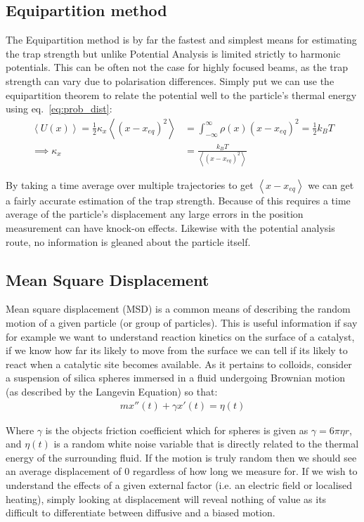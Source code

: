 \subsection{Equipartition method}
The Equipartition method is by far the fastest and simplest means 
for estimating the trap strength but unlike Potential Analysis is 
limited strictly to harmonic potentials. This can be often not the 
case for highly focused beams, as the trap strength can vary due to 
polarisation differences. Simply put we can use the equipartition 
theorem to relate the potential well to the particle's thermal 
energy using eq.~\ref{eq:prob_dist}:
\begin{align}
	\left<U(x)\right> = \frac{1}{2}\kappa_x\left<(x-x_{eq})^2\right> &= \int_{-\infty}^{\infty}\rho(x)(x-x_{eq})^2 = \frac{1}{2}k_BT \\
	\implies \kappa_x &= \frac{k_BT}{\left<(x-x_{eq})^2\right>} 
\end{align}

By taking a time average over multiple trajectories to get 
$\left<x-x_{eq}\right>$ we can get a fairly accurate estimation 
of the trap strength. Because of this requires a time average of 
the particle's displacement any large errors in the position 
measurement can have knock-on effects. Likewise with the potential 
analysis route, no information is gleaned about the particle itself.

\subsection{Mean Square Displacement}
Mean square displacement (MSD) is a common means of describing 
the random motion of a given particle (or group of particles). 
This is useful information if say for example we want to understand 
reaction kinetics on the surface of a catalyst, if we know how 
far its likely to move from the surface we can tell if its likely 
to react when a catalytic site becomes available. As it pertains 
to colloids, consider a suspension of silica spheres immersed in 
a fluid undergoing Brownian motion (as described by the Langevin 
Equation) so that:
\begin{align}
	mx''(t) + \gamma x'(t) = \eta(t)
\end{align}

Where $\gamma$ is the objects friction coefficient which for spheres 
is given as $\gamma = 6\pi\eta r$, and $\eta(t)$ is a random white 
noise variable that is directly related to the thermal energy of 
the surrounding fluid. If the motion is truly random then we should 
see an average displacement of 0 regardless of how long we measure 
for. If we wish to understand the effects of a given external factor 
(i.e. an electric field or localised heating), simply looking at 
displacement will reveal nothing of value as its difficult to 
differentiate between diffusive and a biased motion. 

